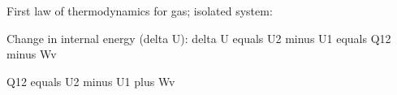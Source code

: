 First law of thermodynamics for gas; isolated system:  

Change in internal energy (delta U):  
delta U equals U2 minus U1 equals Q12 minus Wv  

Q12 equals U2 minus U1 plus Wv